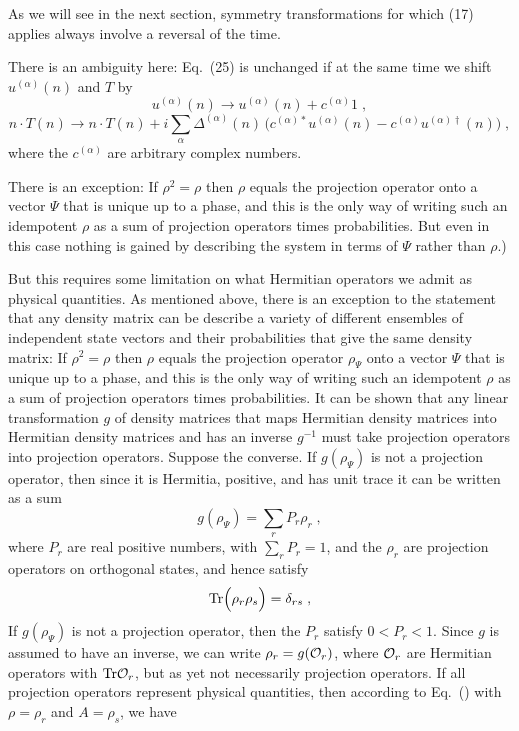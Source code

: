 As we will see in the next section, symmetry transformations for which (17) applies always involve a reversal of the time.

There is an ambiguity here: Eq.~(25) is unchanged if at the same time we shift $u^{(\alpha)}(n)$ and $T$ by
$$u^{(\alpha)}(n)\rightarrow u^{(\alpha)}(n)+c^{(\alpha)}1\;,$$
$$n\cdot T(n)\rightarrow n\cdot T(n)+i\sum_\alpha \Delta^{(\alpha)}(n)\,\Big(c^{(\alpha)*}u^{(\alpha)}(n)-c^{(\alpha)}u^{(\alpha)\dagger}(n)\Big)\;,$$
where the $c^{(\alpha)}$ are arbitrary complex numbers.

There is an exception: If $\rho^2=\rho$ then $\rho$ equals the projection operator onto a vector $\Psi$ that is unique up to a phase, and this is the only way of writing such an idempotent $\rho$ as a sum of projection operators times probabilities.  But even in this case nothing is gained by describing the system in terms of $ \Psi$ rather than $\rho$.)


But this requires some limitation on what Hermitian operators we admit as physical quantities.  As mentioned above, there is an exception to the statement that any density matrix can be describe a variety of different ensembles of independent state vectors and their probabilities that give the same density matrix: If $\rho^2=\rho$ then $\rho$ equals the projection operator $\rho_\Psi$ onto a vector $\Psi$ that is unique up to a phase, and this is the only way of writing such an idempotent $\rho$ as a sum of projection operators times probabilities.    It can be shown that any linear transformation $g$ of density matrices that maps Hermitian density matrices into Hermitian density matrices and has an inverse $g^{-1}$ must take projection operators into projection operators.  Suppose the converse. If $g(\rho_\Psi)$ is not a projection operator, then since it is Hermitia, positive, and has unit trace it can be written as a sum
$$ g(\rho_\Psi)=\sum_r P_r\rho_r\;,$$
where $P_r$ are real positive numbers, with  $\sum_rP_r=1$, and the $\rho_r$ are projection operators on orthogonal states, and hence satisfy
$$ {\rm Tr}\Big(\rho_r\rho_s\Big)=\delta_{rs}\;,$$
If $g(\rho_\Psi)$ is not a projection operator, then the $P_r$ satisfy $0<P_r<1$.  Since $g$ is assumed to have an inverse, we can write
$\rho_r=g({\cal O}_r)$, where  ${\cal O}_r$ are Hermitian operators with ${\rm Tr} {\cal O}_r$, but as yet not necessarily projection operators.  If all projection operators represent physical quantities, then according to Eq.~() with $\rho=\rho_r$ and $A=\rho_s$, we have
